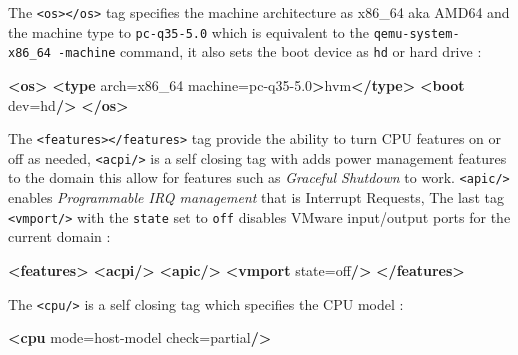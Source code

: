 \documentclass[
  14pt,
  english,
  a4paper,
]{scrreprt}
\newenvironment{Shaded}{}{}
\newcommand{\KeywordTok}[1]{\textcolor[rgb]{0.00,0.44,0.13}{\textbf{#1}}}
\newcommand{\NormalTok}[1]{#1}
\newcommand{\OtherTok}[1]{\textcolor[rgb]{0.00,0.44,0.13}{#1}}
\newcommand{\StringTok}[1]{\textcolor[rgb]{0.25,0.44,0.63}{#1}}
\begin{document}
The \texttt{\textless{}os\textgreater{}\textless{}/os\textgreater{}} tag
specifies the machine architecture as x86\_64 aka AMD64 and the machine
type to \texttt{pc-q35-5.0} which is equivalent to the
\texttt{qemu-system-x86\_64\ -machine} command, it also sets the boot
device as \texttt{hd} or hard drive :

\begin{Shaded}
\begin{Highlighting}[]
  \KeywordTok{\textless{}os\textgreater{}}
    \KeywordTok{\textless{}type}\OtherTok{ arch=}\StringTok{\textquotesingle{}x86\_64\textquotesingle{}}\OtherTok{ machine=}\StringTok{\textquotesingle{}pc{-}q35{-}5.0\textquotesingle{}}\KeywordTok{\textgreater{}}\NormalTok{hvm}\KeywordTok{\textless{}/type\textgreater{}}
    \KeywordTok{\textless{}boot}\OtherTok{ dev=}\StringTok{\textquotesingle{}hd\textquotesingle{}}\KeywordTok{/\textgreater{}}
  \KeywordTok{\textless{}/os\textgreater{}}
\end{Highlighting}
\end{Shaded}

The
\texttt{\textless{}features\textgreater{}\textless{}/features\textgreater{}}
tag provide the ability to turn CPU features on or off as needed,
\texttt{\textless{}acpi/\textgreater{}} is a self closing tag with adds
power management features to the domain this allow for features such as
\emph{Graceful Shutdown} to work.
\texttt{\textless{}apic/\textgreater{}} enables \emph{Programmable IRQ
management} that is Interrupt Requests, The last tag
\texttt{\textless{}vmport/\textgreater{}} with the \texttt{state} set to
\texttt{off} disables VMware input/output ports for the current domain :

\begin{Shaded}
\begin{Highlighting}[]
  \KeywordTok{\textless{}features\textgreater{}}
    \KeywordTok{\textless{}acpi/\textgreater{}}
    \KeywordTok{\textless{}apic/\textgreater{}}
    \KeywordTok{\textless{}vmport}\OtherTok{ state=}\StringTok{\textquotesingle{}off\textquotesingle{}}\KeywordTok{/\textgreater{}}
  \KeywordTok{\textless{}/features\textgreater{}}
\end{Highlighting}
\end{Shaded}

The \texttt{\textless{}cpu/\textgreater{}} is a self closing tag which
specifies the CPU model :

\begin{Shaded}
\begin{Highlighting}[]
  \KeywordTok{\textless{}cpu}\OtherTok{ mode=}\StringTok{\textquotesingle{}host{-}model\textquotesingle{}}\OtherTok{ check=}\StringTok{\textquotesingle{}partial\textquotesingle{}}\KeywordTok{/\textgreater{}}
\end{Highlighting}
\end{Shaded}
\end{document}

